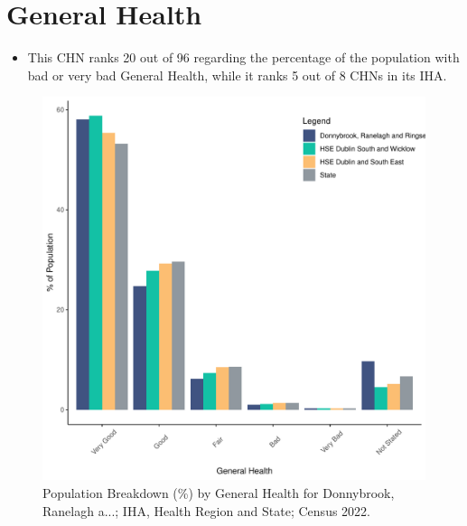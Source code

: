 \documentclass{article}
\begin{document}
\pagebreak

\section{General Health}\label{sect:GenHealth}
\begin{itemize}
\item  This CHN ranks  20 out of 96 regarding the percentage of the population with bad or very bad General Health, while it ranks   5 out of 8 CHNs in its IHA.
\end{itemize}
\begin{figure}[h]
	\centering
	\includegraphics[width = 150mm]{../figures/GenED.pdf}
	\caption{Population Breakdown (\%) by General Health for Donnybrook, Ranelagh a...; IHA, Health Region and State;  Census 2022.}
	\label{fig:2ae19629-1a6a-13a3-e055-000000000001}
	\end{figure}
\end{document}
